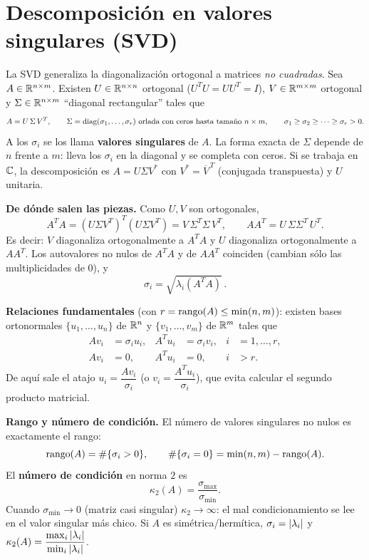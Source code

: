 \section{Descomposición en valores singulares (SVD)}

\begin{teoria}
La SVD generaliza la diagonalización ortogonal a matrices \emph{no cuadradas}. Sea $A\in\mathbb{R}^{n\times m}$. Existen $U\in\mathbb{R}^{n\times n}$ ortogonal ($U^TU=UU^T=I$), $V\in\mathbb{R}^{m\times m}$ ortogonal y $\Sigma\in\mathbb{R}^{n\times m}$ ``diagonal rectangular'' tales que
\[
A = U\,\Sigma\,V^T,
\qquad
\Sigma=\operatorname{diag}(\sigma_1,\dots,\sigma_r)\ \text{orlada con ceros hasta tamaño } n\times m,
\qquad
\sigma_1\ge\sigma_2\ge\dots\ge\sigma_r>0.
\]
A los $\sigma_i$ se los llama \textbf{valores singulares} de $A$. La forma exacta de $\Sigma$ depende de $n$ frente a $m$: lleva los $\sigma_i$ en la diagonal y se completa con ceros. Si se trabaja en $\mathbb{C}$, la descomposición es $A=U\Sigma V^*$ con $V^*=\overline{V}^{\,T}$ (conjugada transpuesta) y $U$ unitaria.

\medskip
\textbf{De dónde salen las piezas.} Como $U,V$ son ortogonales,
\[
A^TA = (U\Sigma V^T)^T(U\Sigma V^T) = V\,\Sigma^T\Sigma\,V^T,
\qquad
AA^T = U\,\Sigma\Sigma^T\,U^T .
\]
Es decir: $V$ diagonaliza ortogonalmente a $A^TA$ y $U$ diagonaliza ortogonalmente a $AA^T$. Los autovalores no nulos de $A^TA$ y de $AA^T$ coinciden (cambian sólo las multiplicidades de $0$), y
\[
\sigma_i=\sqrt{\lambda_i(A^TA)}\,.
\]

\textbf{Relaciones fundamentales} (con $r=\operatorname{rango}(A)\le\min(n,m)$): existen bases ortonormales $\{u_1,\dots,u_n\}$ de $\mathbb{R}^n$ y $\{v_1,\dots,v_m\}$ de $\mathbb{R}^m$ tales que
\begin{align*}
A v_i &= \sigma_i u_i, & A^T u_i &= \sigma_i v_i, & i&=1,\dots,r,\\
A v_i &= 0, & A^T u_i &= 0, & i&>r.
\end{align*}
De aquí sale el atajo $u_i=\dfrac{Av_i}{\sigma_i}$ (o $v_i=\dfrac{A^Tu_i}{\sigma_i}$), que evita calcular el segundo producto matricial.

\textbf{Rango y número de condición.} El número de valores singulares no nulos es exactamente el rango:
\[
\operatorname{rango}(A)=\#\{\sigma_i>0\},
\qquad
\#\{\sigma_i=0\}=\min(n,m)-\operatorname{rango}(A).
\]
El \textbf{número de condición} en norma $2$ es
\[
\kappa_2(A)=\frac{\sigma_{\max}}{\sigma_{\min}} .
\]
Cuando $\sigma_{\min}\to 0$ (matriz casi singular) $\kappa_2\to\infty$: el mal condicionamiento se lee en el valor singular más chico. Si $A$ es simétrica/hermítica, $\sigma_i=\left\lvert \lambda_i \right\rvert$ y $\kappa_2(A)=\dfrac{\max_i\left\lvert \lambda_i \right\rvert}{\min_i\left\lvert \lambda_i \right\rvert}$.
\end{teoria}

